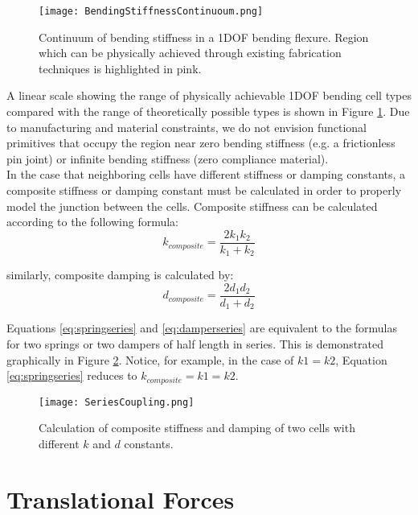 { \begin{figure}
  \texttt{[image: BendingStiffnessContinuoum.png]}
  \caption{Continuum of bending stiffness in a 1DOF bending flexure.  Region which can be physically achieved through existing fabrication techniques is highlighted in pink.}
  \label{fig:BendingStiffnessContinuoum}
\end{figure}

A linear scale showing the range of physically achievable 1DOF bending cell types compared with the range of theoretically possible types is shown in Figure \ref{fig:BendingStiffnessContinuoum}.  Due to manufacturing and material constraints, we do not envision functional primitives that occupy the region near zero bending stiffness (e.g. a frictionless pin joint) or infinite bending stiffness (zero compliance material).\\

In the case that neighboring cells have different stiffness or damping constants, a composite stiffness or damping constant must be calculated in order to properly model the junction between the cells.  Composite stiffness can be calculated according to the following formula:
 \begin{equation} \label{eq:springseries}
 k_{composite} = \dfrac{2k_1k_2}{k_1+k_2}
 \end{equation}

similarly, composite damping is calculated by:
 \begin{equation} \label{eq:damperseries}
d_{composite} = \dfrac{2d_1d_2}{d_1+d_2}
 \end{equation}
 
 Equations \ref{eq:springseries} and \ref{eq:damperseries} are equivalent to the formulas for two springs or two dampers of half length in series.  This is demonstrated graphically in Figure \ref{fig:SeriesCoupling}.  Notice, for example, in the case of $k1=k2$, Equation \ref{eq:springseries} reduces to $ k_{composite} = k1 = k2$.
 
 \begin{figure}
  \texttt{[image: SeriesCoupling.png]}
  \caption{Calculation of composite stiffness and damping of two cells with different $k$ and $d$ constants.}
  \label{fig:SeriesCoupling}
\end{figure}

\section{Translational Forces}

}
